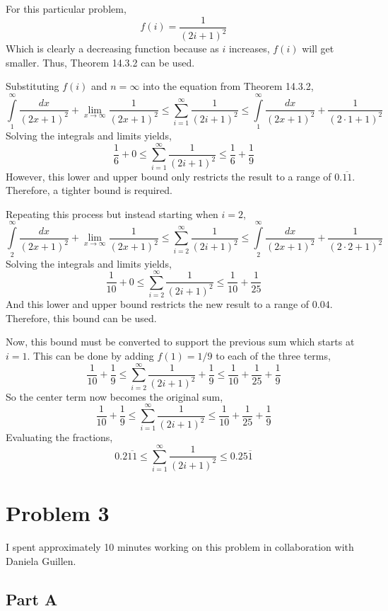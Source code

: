 \documentclass{article}
\begin{document}
For this particular problem,
$$ f(i) = \frac{1}{(2i + 1)^2} $$
Which is clearly a decreasing function because as $i$ increases, $f(i)$ will get
smaller. Thus, Theorem 14.3.2 can be used.

Substituting $f(i)$ and $n = \infty$ into the equation from Theorem 14.3.2,
$$ \int\limits_1^\infty \frac{dx}{(2x + 1)^2} + \lim_{x \to \infty} \frac{1}{(2x
+ 1)^2} \leq \sum\limits_{i=1}^{\infty} \frac{1}{(2i + 1)^2} \leq
\int\limits_1^\infty \frac{dx}{(2x + 1)^2} + \frac{1}{(2 \cdot 1 + 1)^2} $$
Solving the integrals and limits yields,
$$ \frac{1}{6} + 0 \leq \sum\limits_{i=1}^{\infty} \frac{1}{(2i + 1)^2} \leq
\frac{1}{6} + \frac{1}{9} $$
However, this lower and upper bound only restricts the result to a range of
$0.\overline{11}$. Therefore, a tighter bound is required.

Repeating this process but instead starting when $i = 2$,
$$ \int\limits_2^\infty \frac{dx}{(2x + 1)^2} + \lim_{x \to \infty} \frac{1}{(2x
+ 1)^2} \leq \sum\limits_{i=2}^{\infty} \frac{1}{(2i + 1)^2} \leq
\int\limits_2^\infty \frac{dx}{(2x + 1)^2} + \frac{1}{(2 \cdot 2 + 1)^2} $$
Solving the integrals and limits yields,
$$ \frac{1}{10} + 0 \leq \sum\limits_{i=2}^{\infty} \frac{1}{(2i + 1)^2} \leq
\frac{1}{10} + \frac{1}{25} $$
And this lower and upper bound restricts the new result to a range of $0.04$.
Therefore, this bound can be used.

Now, this bound must be converted to support the previous sum which starts at $i
= 1$. This can be done by adding $f(1) = 1/9$ to each of the three terms,
$$ \frac{1}{10} + \frac{1}{9} \leq \sum\limits_{i=2}^{\infty} \frac{1}{(2i +
1)^2} + \frac{1}{9} \leq \frac{1}{10} + \frac{1}{25} + \frac{1}{9} $$
So the center term now becomes the original sum,
$$ \frac{1}{10} + \frac{1}{9} \leq \sum\limits_{i=1}^{\infty} \frac{1}{(2i +
1)^2} \leq \frac{1}{10} + \frac{1}{25} + \frac{1}{9} $$
Evaluating the fractions,
$$ 0.2\overline{11} \leq \sum\limits_{i=1}^{\infty} \frac{1}{(2i + 1)^2} \leq
0.25\overline{1} $$

\break

\section*{Problem 3}

I spent approximately 10 minutes working on this problem in collaboration with
Daniela Guillen.

\subsection*{Part A}
\end{document}
